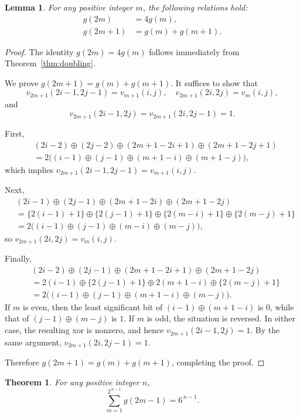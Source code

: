 \documentclass{article}
\theoremstyle{definition}
\theoremstyle{plain}
\newtheorem{theorem}[definition]{Theorem}
\newtheorem{lemma}[definition]{Lemma}
\theoremstyle{remark}
\begin{document}
\begin{lemma}
\label{lem:recurrence}
For any positive integer $m$, the following relations hold:
\begin{align*}
g(2m) &= 4g(m),\\
g(2m+1) &= g(m)+g(m+1).
\end{align*}
\end{lemma}

\begin{proof}
The identity $g(2m)=4g(m)$ follows immediately from
Theorem~\ref{thm:doubling}.

We prove $g(2m+1)=g(m)+g(m+1)$.
It suffices to show that
\[
v_{2m+1}(2i-1,2j-1)=v_{m+1}(i,j),\quad
v_{2m+1}(2i,2j)=v_m(i,j),
\]
and
\[
v_{2m+1}(2i-1,2j)=v_{2m+1}(2i,2j-1)=1.
\]

First,
\begin{align*}
&(2i-2)\oplus(2j-2)\oplus(2m+1-2i+1)\oplus(2m+1-2j+1)\\
&=2\bigl((i-1)\oplus(j-1)\oplus(m+1-i)\oplus(m+1-j)\bigr),
\end{align*}
which implies $v_{2m+1}(2i-1,2j-1)=v_{m+1}(i,j)$.

Next,
\begin{align*}
&(2i-1)\oplus(2j-1)\oplus(2m+1-2i)\oplus(2m+1-2j)\\
&=\{2(i-1)+1\}\oplus\{2(j-1)+1\}\oplus\{2(m-i)+1\}\oplus\{2(m-j)+1\}\\
&=2\bigl((i-1)\oplus(j-1)\oplus(m-i)\oplus(m-j)\bigr),
\end{align*}
so $v_{2m+1}(2i,2j)=v_m(i,j)$.

Finally,
\begin{align*}
&(2i-2)\oplus(2j-1)\oplus(2m+1-2i+1)\oplus(2m+1-2j)\\
&=2(i-1)\oplus\{2(j-1)+1\}\oplus2(m+1-i)\oplus\{2(m-j)+1\}\\
&=2\bigl( (i-1)\oplus(j-1)\oplus(m+1-i)\oplus(m-j)\bigr) .
\end{align*}
If $m$ is even, then the least significant bit of
$(i-1)\oplus(m+1-i)$ is $0$, while that of
$(j-1)\oplus(m-j)$ is $1$.
If $m$ is odd, the situation is reversed.
In either case, the resulting xor is nonzero, and hence
$v_{2m+1}(2i-1,2j)=1$.
By the same argument,
$v_{2m+1}(2i,2j-1)=1$.

Therefore $g(2m+1)=g(m)+g(m+1)$, completing the proof.
\end{proof}

\begin{theorem}
\label{thm:odd-sum}
For any positive integer $n$,
\[
\sum_{m=1}^{2^{\,n-1}} g(2m-1)=6^{\,n-1}.
\]
\end{theorem}
\end{document}
